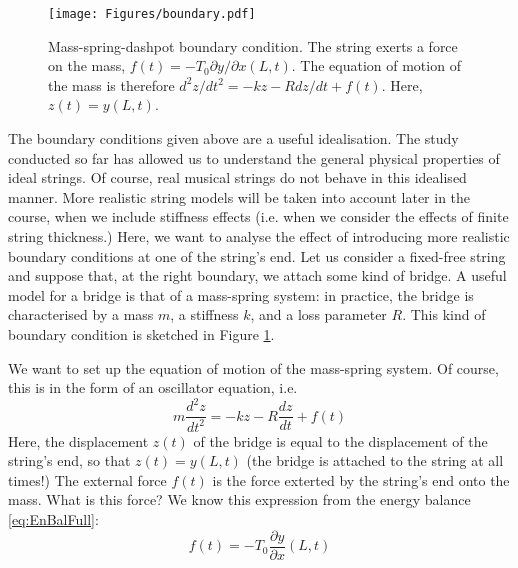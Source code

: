 \documentclass[11pt,twoside,a4paper,english]{book}
\begin{document}
\begin{figure}
\texttt{[image: Figures/boundary.pdf]}
\caption{Mass-spring-dashpot boundary condition. The string exerts a force on the mass, $f(t) = -T_0 \partial y / \partial x (L,t)$. The equation of motion of the mass is therefore $d^2 z / dt^2 = -kz -R dz/dt + f(t)$. Here, $z(t) = y(L,t)$.}\label{fig:impBc}
\end{figure}

The boundary conditions given above are a useful idealisation. The study conducted so far has allowed us to understand the general physical properties of ideal strings. Of course, real musical strings do not behave in this idealised manner. More realistic string models will be taken into account later in the course, when  we include stiffness effects (i.e. when we consider the effects of finite string thickness.) Here, we want to analyse the effect of introducing more realistic boundary conditions at one of the string's end. Let us consider a fixed-free string and suppose that, at the right boundary, we attach some kind of bridge. A useful model for a bridge is that of a mass-spring system: in practice, the bridge is characterised by a mass $m$, a stiffness $k$, and a loss parameter $R$. This kind of boundary condition is sketched in Figure \ref{fig:impBc}.




\medskip \medskip 
\noindent 
We want to set up the equation of motion of the mass-spring system. Of course, this is in the form of an oscillator equation, i.e. 
\begin{equation}\label{eq:ImpBSc}
m \frac{d^2 z}{dt^2} = - k z - R \frac{d z}{dt} + f(t)
\end{equation}
Here, the displacement $z(t)$ of the bridge is equal to the displacement of the string's end, so that $z(t) = y(L,t)$ (the bridge is attached to the string at all times!)
The external force $f(t)$ is the force exterted by the string's end onto the mass. What is this force? We know this expression from the energy balance \eqref{eq:EnBalFull}: 
\begin{equation}\label{eq:ft}
f(t) = - T_0 \frac{\partial y}{\partial x}(L,t)
\end{equation}
\end{document}
